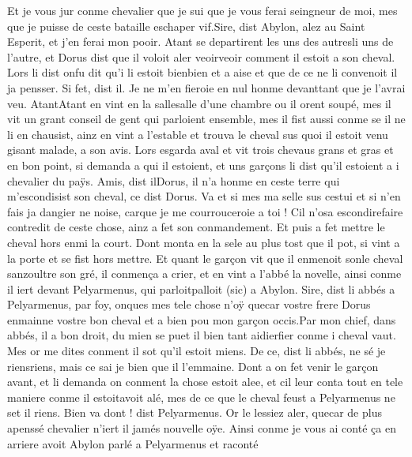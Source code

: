 \documentclass{article}
\begin{document}
\begin{pages}
      Et je vous jur conme chevalier que je sui que je vous ferai 
      seingneur de moi, mes que je puisse de ceste bataille eschaper vif.Sire, dist Abylon, alez au Saint Esperit, et j’en ferai mon pooir.
   Atant se departirent les uns des autresli uns de l'autre, et 
   Dorus dist que il voloit aler 
      veoirveoir comment il estoit a son cheval. Lors li 
   dist onfu dit 
   qu’i li estoit bienbien et a aise et 
      que de ce ne li convenoit il ja pensser.
   Si fet, dist il. Je ne m’en fieroie en nul honme 
      devanttant que je l’avrai veu.
   AtantAtant en vint en la 
   sallesalle d'une chambre ou il orent soupé, 
   mes il vit un grant conseil de gent qui parloient ensemble, mes il fist aussi 
   conme se il ne li en chausist, 
   ainz en vint a l’estable et trouva le cheval sus quoi il estoit venu gisant malade, a son avis. Lors esgarda aval et 
   vit trois chevaus grans et gras et en bon point, si demanda a qui il estoient, 
   et uns garçons li dist qu’il estoient a 
      i chevalier du paÿs.
   Amis, dist ilDorus, il n’a honme en 
      ceste terre qui m’escondisist son cheval, 
      ce dist Dorus. Va et si mes ma selle sus cestui et si n’en fais ja dangier ne noise, 
      carque je me courrouceroie a toi !
   Cil n’osa escondirefaire contredit de ceste chose, 
   ainz a fet son conmandement. Et puis a fet mettre le cheval hors enmi la court. 
   Dont monta en la sele au plus tost que il pot, si vint a la porte et se fist hors mettre. Et quant 
   le garçon vit que il enmenoit 
   sonle cheval 
   sanzoultre son gré, il 
   conmença a crier, et en vint a l’abbé la novelle, 
   ainsi conme il iert devant Pelyarmenus, qui 
   parloitpalloit (sic) a Abylon.
   Sire, dist li abbés a 
   Pelyarmenus, par foy, onques mes tele chose n’oÿ 
      quecar vostre frere 
      Dorus enmainne vostre bon cheval et a bien 
      pou mon garçon occis.Par mon chief, dans abbés, il a bon droit, du mien se puet il bien tant 
      aidierfier conme i cheval vaut. 
      Mes or me dites conment il sot qu’il estoit miens.
   De ce, dist li abbés, ne sé je 
      riensriens, mais ce sai je bien que il l'emmaine.
   Dont a on fet venir le garçon avant, et li demanda on 
   conment la chose estoit alee, et cil leur conta tout en tele maniere 
   conme il estoitavoit alé, mes de ce que le cheval feust a 
   Pelyarmenus ne set il riens.
   Bien va dont ! dist Pelyarmenus. 
      Or le lessiez aler, quecar de plus apenssé chevalier n’iert il jamés nouvelle oÿe. \pend
\pstart Ainsi conme je vous ai conté ça en arriere avoit 
   Abylon parlé a Pelyarmenus et raconté 

\end{pages}
\end{document}

